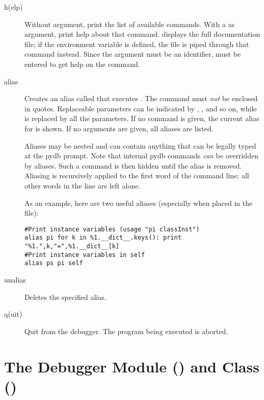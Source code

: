\begin{description}

\item[h(elp) ]

Without argument, print the list of available commands.  With a
 as argument, print help about that command.   displays the full documentation file; if the environment variable
 is defined, the file is piped through that command
instead.  Since the  argument must be an identifier,
 must be entered to get help on the \samp{!} command.

\item[alias ]\label{command:aliases}

Creates an alias called  that executes .  The
command must \emph{not} be enclosed in quotes.  Replaceable parameters
can be indicated by , , and so on, while \samp{\%*} is
replaced by all the parameters.  If no command is given, the current
alias for  is shown. If no arguments are given, all
aliases are listed.

Aliases may be nested and can contain anything that can be
legally typed at the pydb prompt.  Note that internal pydb commands
\emph{can} be overridden by aliases.  Such a command is
then hidden until the alias is removed.  Aliasing is recursively
applied to the first word of the command line; all other words
in the line are left alone.

As an example, here are two useful aliases (especially when placed
in the  file):

\begin{verbatim}
#Print instance variables (usage "pi classInst")
alias pi for k in %1.__dict__.keys(): print "%1.",k,"=",%1.__dict__[k]
#Print instance variables in self
alias ps pi self
\end{verbatim}
                
\item[unalias ]

Deletes the specified alias.

\item[q(uit)]

Quit from the debugger.
The program being executed is aborted.

\end{description}

\section{The Debugger Module () and Class () \label{debugger-module}}

